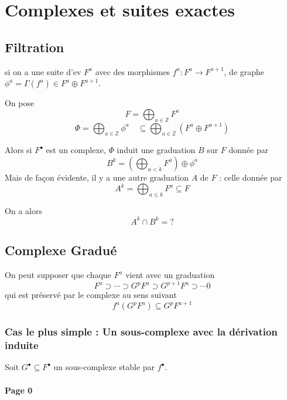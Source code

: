 \documentclass[11pt,draft,makeidx]{amsart}
\title{}
\begin{document}
\section{Complexes et suites exactes}
\subsection{Filtration}
si on a une suite d'ev $F^a$ avec des morphismes $f^a : F^a \to F^{a+1}$, de graphe $\phi^a = \Gamma(f^a) \in F^a \oplus F^{a+1}$.

On pose
\[
F = \bigoplus_{a \in \mathbb{Z}} F^a
\]
\[
\Phi = \bigoplus_{a \in \mathbb{Z}} \phi^a \quad \subseteq \bigoplus_{a \in \mathbb{Z}} \left(F^a\oplus F^{a+1}\right)
\]

Alors si $F^\bullet$ est un complexe, $\Phi$ induit une graduation $B$ sur $F$ donnée par
\[
B^k = \left(\bigoplus_{a<k} F^a\right) \oplus \phi^a
\]
Mais de façon évidente, il y a une autre graduation $A$ de $F$ : celle donnée par
\[
A^k = \bigoplus_{a \leq k} F^a \subseteq F
\]

On a alors
\[
A^k \cap B^k = ?
\]

\vfill
\newpage
\subsection{Complexe Gradué}
On peut supposer que chaque $F^a$ vient avec un graduation
\[
F^a \supset \cdots \supset G^pF^a \supset G^{p+1}F^a \supset \cdots 0
\]
qui est préservé par le complexe au sens suivant
\[
f^a\left(G^pF^a\right) \subseteq G^pF^{a+1}
\]

\subsubsection{Cas le plus simple : Un sous-complexe avec la dérivation induite}
Soit $G^\bullet \subseteq F^\bullet$ un sous-complexe stable par $f^\bullet$.

\paragraph{\textbf{Page 0}}
\begin{center}
\end{center}
\end{document}
